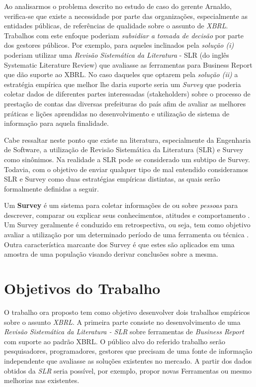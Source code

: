 \documentclass{article}
\begin{document}
Ao analisarmos o problema descrito no estudo de caso do gerente
Arnaldo, verifica-se que existe a necessidade por parte das
organizações, especialmente as entidades públicas, de referências de
qualidade sobre o assunto de \textit{XBRL}. Trabalhos com este enfoque
poderiam \textit{subsidiar a tomada de decisão} por parte dos gestores
públicos. Por exemplo, para aqueles inclinados pela \textit{solução
  (i)} poderiam utilizar uma  \textit{Revisão Sistemática da
  Literatura} - SLR (do inglês Systematic Literature Review) que
avaliasse as ferramentas para Business Report que dão suporte ao
XBRL. No caso daqueles que optarem pela  \textit{solução (ii)} a
estratégia empírica que melhor lhe daria suporte seria um
\textit{Survey} que poderia coletar dados de diferentes partes
interessadas (stakeholders) sobre o processo de prestação de contas
das diversas prefeituras do país afim de avaliar as melhores práticas
e lições aprendidas no desenvolvimento e utilização de sistema de
informação para aquela finalidade.

Cabe ressaltar neste ponto que existe na literatura, especialmente da
Engenharia de Software, a utilização de Revisão Sistemática da
Literatura (SLR) e Survey como sinônimos. Na realidade a SLR pode se
considerado um subtipo de Survey. Todavia, com o objetivo de enviar
qualquer tipo de mal entendido consideramos SLR e Survey como duas
estratégias empíricas \cite{wohlin2012experimentation} distintas, as
quais serão formalmente definidas a seguir.

Um \textbf{Survey} é um sistema para coletar informações de ou sobre
\textit{pessoas} para descrever, comparar ou explicar seus
conhecimentos, atitudes e comportamento \cite{fink2003survey}. Um
Survey geralmente é conduzido em retrospectiva, ou seja, tem como
objetivo avaliar a utilização por um determinado período de uma
ferramenta ou técnica \cite{kitchenham2009systematic}. Outra
característica marcante dos Survey é que estes são aplicados em uma
amostra de uma população visando derivar conclusões sobre a mesma\cite{robson2002real}.

\section{Objetivos do Trabalho}
\label{sec:objetivos}

O trabalho ora proposto tem como objetivo desenvolver dois trabalhos
empíricos sobre o assunto \textit{XBRL}. A primeira parte consiste no
desenvolvimento de uma \textit{Revisão Sistemática da Literatura -
  SLR} sobre ferramentas de \textit{Business Report} com suporte ao
padrão XBRL. O público alvo do referido trabalho serão pesquisadores,
programadores, gestores que precisam de uma fonte de informação
independente que avaliasse as soluções existentes no mercado. A partir
dos dados obtidos da \textit{SLR} seria possível, por exemplo, propor
novas Ferramentas ou mesmo melhorias nas existentes.
\end{document}
